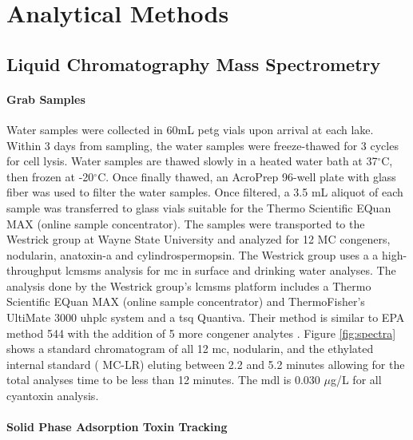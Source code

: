 \section{Analytical Methods}

\subsection{Liquid Chromatography Mass Spectrometry} \label{sc:lcms}

\paragraph{Grab Samples}

Water samples were collected in 60mL \gls{petg} vials upon arrival at each lake. Within 3 days from sampling, the water samples were freeze-thawed for 3 cycles for cell lysis. Water samples are thawed slowly in a heated water bath at 37$^\circ$C, then frozen at -20$^\circ$C. Once finally thawed, an AcroPrep 96-well plate with glass fiber was used to filter the water samples. Once filtered, a 3.5 mL aliquot of each sample was transferred to glass vials suitable for the Thermo Scientific EQuan MAX (online sample concentrator). The samples were transported to the Westrick group at Wayne State University and analyzed for 12 MC congeners, nodularin, anatoxin-a and cylindrospermopsin.  The Westrick group uses a a high-throughput \gls{lcmsms} analysis for \gls{mc} in surface and drinking water analyses.
The analysis done by the Westrick group's \gls{lcmsms} platform includes a Thermo Scientific EQuan MAX (online sample concentrator) and ThermoFisher’s UltiMate 3000 \gls{uhplc} system and a \gls{tsq} Quantiva.
Their method is similar to EPA method 544 with the addition of 5 more congener analytes \cite{shoemaker_method_2015}. Figure \ref{fig:spectra} shows a standard chromatogram of all 12 \gls{mc}, nodularin, and the ethylated internal standard (\ch{[C_2D_5]} MC-LR) eluting between 2.2 and 5.2 minutes allowing for the total analyses time to be less than 12 minutes.  The \gls{mdl} is 0.030  $\mu$g/L  for all cyantoxin analysis. 

\paragraph{Solid Phase Adsorption Toxin Tracking}


